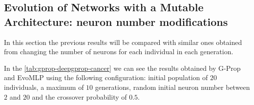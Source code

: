 \documentclass[conference]{IEEEtran}\usepackage[]{graphicx}\usepackage[]{color}
\begin{document}

\subsection{Evolution of Networks with a Mutable Architecture: neuron number modifications}


In this section the previous results will be compared with similar ones
obtained from changing the number of neurons for each individual in each
generation.


In the \autoref{tab:gprop-deepgprop-cancer} we can see the results obtained by
G-Prop and {\sf EvoMLP} using the following configuration: initial population of
$20$ individuals, a maximum of $10$ generations, random initial neuron number
between $2$ and $20$ and the crossover probability of $0.5$.

\end{document}
